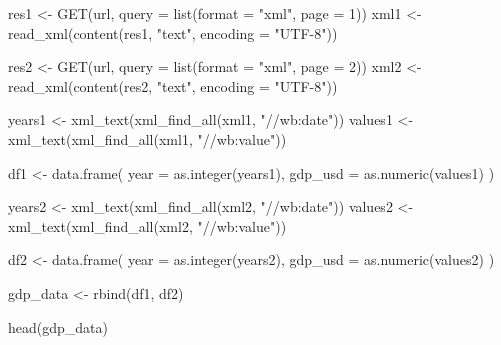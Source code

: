 \documentclass[
  letterpaper,
  DIV=11,
  numbers=noendperiod]{scrreprt}
\newenvironment{Shaded}{\begin{snugshade}}{\end{snugshade}}
\newcommand{\AttributeTok}[1]{\textcolor[rgb]{0.40,0.45,0.13}{#1}}
\newcommand{\DecValTok}[1]{\textcolor[rgb]{0.68,0.00,0.00}{#1}}
\newcommand{\FunctionTok}[1]{\textcolor[rgb]{0.28,0.35,0.67}{#1}}
\newcommand{\NormalTok}[1]{\textcolor[rgb]{0.00,0.23,0.31}{#1}}
\newcommand{\OtherTok}[1]{\textcolor[rgb]{0.00,0.23,0.31}{#1}}
\newcommand{\StringTok}[1]{\textcolor[rgb]{0.13,0.47,0.30}{#1}}
\begin{document}
\begin{Shaded}
\begin{Highlighting}[]
\NormalTok{res1 }\OtherTok{\textless{}{-}} \FunctionTok{GET}\NormalTok{(url, }\AttributeTok{query =} \FunctionTok{list}\NormalTok{(}\AttributeTok{format =} \StringTok{"xml"}\NormalTok{, }\AttributeTok{page =} \DecValTok{1}\NormalTok{))}
\NormalTok{xml1 }\OtherTok{\textless{}{-}}  \FunctionTok{read\_xml}\NormalTok{(}\FunctionTok{content}\NormalTok{(res1, }\StringTok{"text"}\NormalTok{, }\AttributeTok{encoding =} \StringTok{"UTF{-}8"}\NormalTok{))}

\NormalTok{res2 }\OtherTok{\textless{}{-}} \FunctionTok{GET}\NormalTok{(url, }\AttributeTok{query =} \FunctionTok{list}\NormalTok{(}\AttributeTok{format =} \StringTok{"xml"}\NormalTok{, }\AttributeTok{page =} \DecValTok{2}\NormalTok{))}
\NormalTok{xml2 }\OtherTok{\textless{}{-}}  \FunctionTok{read\_xml}\NormalTok{(}\FunctionTok{content}\NormalTok{(res2, }\StringTok{"text"}\NormalTok{, }\AttributeTok{encoding =} \StringTok{"UTF{-}8"}\NormalTok{))}

\NormalTok{years1 }\OtherTok{\textless{}{-}} \FunctionTok{xml\_text}\NormalTok{(}\FunctionTok{xml\_find\_all}\NormalTok{(xml1, }\StringTok{"//wb:date"}\NormalTok{))}
\NormalTok{values1 }\OtherTok{\textless{}{-}} \FunctionTok{xml\_text}\NormalTok{(}\FunctionTok{xml\_find\_all}\NormalTok{(xml1, }\StringTok{"//wb:value"}\NormalTok{))}

\NormalTok{df1 }\OtherTok{\textless{}{-}} \FunctionTok{data.frame}\NormalTok{(}
  \AttributeTok{year =} \FunctionTok{as.integer}\NormalTok{(years1),}
  \AttributeTok{gdp\_usd =} \FunctionTok{as.numeric}\NormalTok{(values1)}
\NormalTok{)}

\NormalTok{years2 }\OtherTok{\textless{}{-}} \FunctionTok{xml\_text}\NormalTok{(}\FunctionTok{xml\_find\_all}\NormalTok{(xml2, }\StringTok{"//wb:date"}\NormalTok{))}
\NormalTok{values2 }\OtherTok{\textless{}{-}} \FunctionTok{xml\_text}\NormalTok{(}\FunctionTok{xml\_find\_all}\NormalTok{(xml2, }\StringTok{"//wb:value"}\NormalTok{))}

\NormalTok{df2 }\OtherTok{\textless{}{-}} \FunctionTok{data.frame}\NormalTok{(}
  \AttributeTok{year =} \FunctionTok{as.integer}\NormalTok{(years2),}
  \AttributeTok{gdp\_usd =} \FunctionTok{as.numeric}\NormalTok{(values2)}
\NormalTok{)}

\NormalTok{gdp\_data }\OtherTok{\textless{}{-}} \FunctionTok{rbind}\NormalTok{(df1, df2)}

\FunctionTok{head}\NormalTok{(gdp\_data)}
\end{Highlighting}
\end{Shaded}
\end{document}
